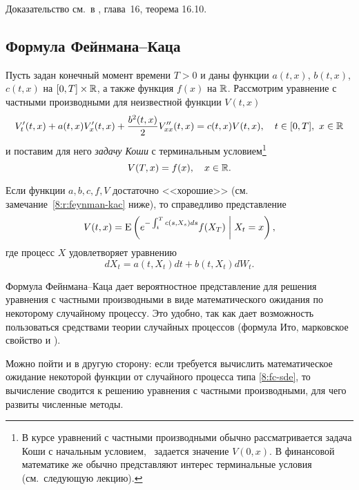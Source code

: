 Доказательство см.~в \cite{Kallenberg97}, глава~16, теорема 16.10.


\subsection{Формула Фейнмана--Каца}

Пусть задан конечный момент времени $T>0$ и даны функции $a(t,x)$, $b(t,x)$, $c(t,x)$ на $[0,T]\times\mathbb{R}$, а также функция $f(x)$ на $\mathbb{R}$.
Рассмотрим уравнение с частными производными для неизвестной функции $V(t,x)$
\begin{equation}
\label{8:fc-equation}
V'_t(t,x) + a(t,x) V'_x(t,x) + \frac{b^2(t,x)}{2} V''_{xx}(t,x) = c(t,x)V(t,x),\quad
t\in[0,T],\ x\in\mathbb{R}
\end{equation}
и поставим для него \emph{задачу Коши} с терминальным условием\footnote{В курсе уравнений с частными производными обычно рассматривается задача Коши с начальным условием, \te\ задается значение $V(0,x)$.
В финансовой математике же обычно представляют интерес терминальные условия (см.~следующую лекцию).}
\begin{equation}
\label{8:fc-terminal}
V(T,x) = f(x),\quad x\in \mathbb{R}.
\end{equation}

\begin{theorem}
Если функции $a,b,c,f,V$ достаточно <<хорошие>> (см. замечание~\ref{8:r:feynman-kac} ниже), то справедливо представление
\begin{equation}
\label{8:fc-v}
V(t,x) = \operatorname{E}\left(e^{-\int_t^T c(s,X_s)ds} f(X_T) \;\bigg|\; X_t = x\right),
\end{equation}
где процесс $X$ удовлетворяет уравнению
\begin{equation}
\label{8:fc-sde}
dX_t = a(t,X_t) dt + b(t,X_t) dW_t.
\end{equation}
\end{theorem}

Формула Фейнмана--Каца дает вероятностное представление для решения уравнения с частными производными в виде математического ожидания по некоторому случайному процессу.
Это удобно, так как дает возможность пользоваться средствами теории случайных процессов (формула Ито, марковское свойство и \td). 

Можно пойти и в другую сторону: если требуется вычислить математическое ожидание некоторой функции от случайного процесса типа \eqref{8:fc-sde}, то вычисление сводится к решению уравнения с частными производными, для чего развиты численные методы.

